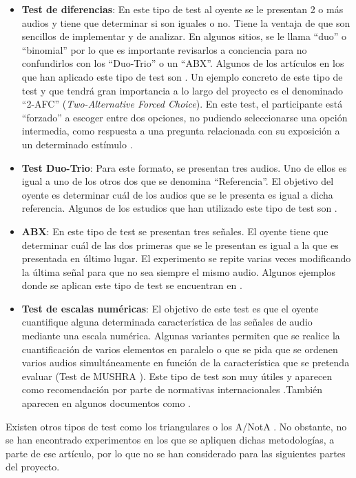 \documentclass[11pt,a4paper]{book}
\begin{document}
    		\begin{itemize}
        		\item \textbf{Test de diferencias}: En este tipo de test al oyente se le presentan 2 o más audios y tiene que determinar si son iguales o no. Tiene la ventaja de que son sencillos de implementar y de analizar. En algunos sitios, se le llama ``duo'' o ``binomial'' por lo que es importante revisarlos a conciencia para no confundirlos con los ``Duo-Trio'' o un ``ABX''. Algunos de los artículos en los que han aplicado este tipo de test son \cite{1995GASoulodre, 1999JBradley,2002PZahorik, 2005IWitew, 2010MVigeant, 2019LKritly}. Un ejemplo concreto de este tipo de test y que tendrá gran importancia a lo largo del proyecto es el denominado ``2-AFC'' (\textit{Two-Alternative Forced Choice}). En este test, el participante está ``forzado'' a escoger entre dos opciones, no pudiendo seleccionarse una opción intermedia, como respuesta a una pregunta relacionada con su exposición a un determinado estímulo \cite{PsychophysicsB}.
        		\item \textbf{Test Duo-Trio}: Para este formato, se presentan tres audios. Uno de ellos es igual a  uno de los otros dos que se denomina ``Referencia''. El objetivo del oyente es determinar cuál de los audios que se le presenta es igual a dicha referencia. Algunos de los estudios que han utilizado este tipo de test son \cite{delaPrida2019, delaPrida2021}.
        		\item \textbf{ABX}: En este tipo de test se presentan tres señales. El oyente tiene que determinar cuál de las dos primeras que se le presentan es igual a la que es presentada en último lugar. El experimento se repite varias veces modificando la última señal para que no sea siempre el mismo audio. Algunos ejemplos donde se aplican este tipo de test se encuentran en \cite{delaPrida2021, Braun2004}.
        		\item \textbf{Test de escalas numéricas}: El objetivo de este test es que el oyente cuantifique alguna determinada característica de las señales de audio mediante una escala numérica. Algunas variantes permiten que se realice la cuantificación de varios elementos en paralelo o que se pida que se ordenen varios audios simultáneamente en función de la característica que se pretenda evaluar (Test de MUSHRA \cite{UIT1534}). Este tipo de test son muy útiles y aparecen como recomendación por parte de normativas internacionales \cite{UIT1116, UIT1284, UIT1534}.También aparecen en algunos documentos como \cite{2011VEmiya,2016BPostma, 2019ZShao,2019GPulvirenti,2019VRajala, 2019JLee, 2019DMorikawa}. 
        		
    		\end{itemize}
    		Existen otros tipos de test como los triangulares o los A/NotA \cite{delaPrida2021, Brockhoff2009}. No obstante, no se han encontrado experimentos en los que se apliquen dichas metodologías, a parte de ese artículo, por lo que no se han considerado para las siguientes partes del proyecto.
    
\end{document}
